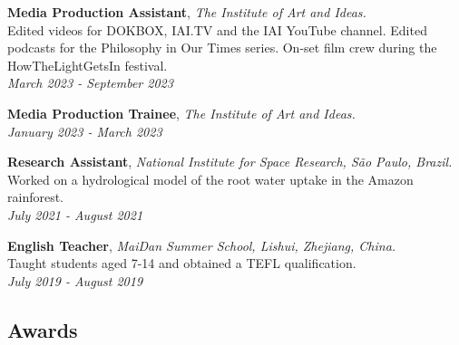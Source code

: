 \documentclass[11pt, a4paper]{article}
\begin{document}
\begin{flushleft}
    \hspace{1cm}\textbf{Media Production Assistant}, \textit{The Institute of Art and Ideas.} \\
    \hspace{1cm}\hangindent=1cm {{Edited videos for DOKBOX, IAI.TV and the IAI YouTube channel. Edited podcasts for the Philosophy in Our Times series. On-set film crew during the HowTheLightGetsIn festival.   }} \\
    \hspace{1cm}\textit{{March 2023 - September 2023}} \\
\end{flushleft}

\begin{flushleft}
    \hspace{1cm}\textbf{Media Production Trainee}, \textit{The Institute of Art and Ideas.} \\
    \hspace{1cm}\textit{{January 2023 - March 2023}} \\
\end{flushleft}

\begin{flushleft}
    \hspace{1cm}\textbf{Research Assistant}, \textit{National Institute for Space Research, São Paulo, Brazil.} \\
    \hspace{1cm}\hangindent=1cm  {Worked on a hydrological model of the root water uptake in the Amazon rainforest.} \\
    \hspace{1cm}\textit{{July 2021 - August 2021}} \\
\end{flushleft}

\begin{flushleft}
    \hspace{1cm}\textbf{English Teacher}, \textit{MaiDan Summer School, Lishui, Zhejiang, China.} \\
    \hspace{1cm}\hangindent=1cm  {Taught students aged 7-14 and obtained a TEFL qualification.} \\
    \hspace{1cm}\textit{{July 2019 - August 2019}} \\
\end{flushleft}

\subsection*{Awards}
\end{document}
